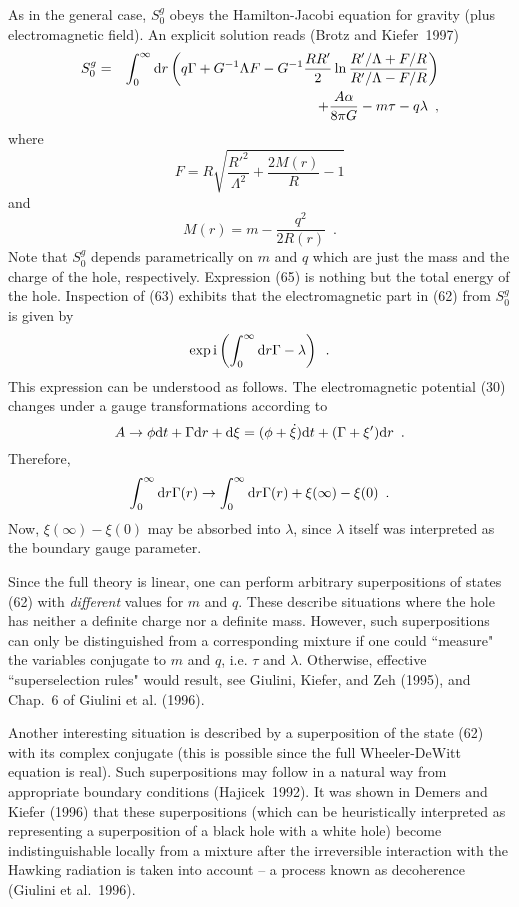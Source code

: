 \documentclass[12pt]{article}
\def\D{{\rm d}}
\def\I{{\rm i}}
\newcommand{\be}{\begin{equation}}
\newcommand{\ee}{\end{equation}}
\newcommand{\bea}{\begin{eqnarray}}
\newcommand{\eea}{\end{eqnarray}}
\begin{document}
As in the general case, $S_0^g$ obeys the Hamilton-Jacobi equation
for gravity (plus electromagnetic field). An explicit solution
reads (Brotz and Kiefer~1997)
\bea S_0^g &=& \int_0^{\infty}\D r\left(q\Gamma +G^{-1}\Lambda F
     -G^{-1}\frac{RR'}{2}\ln\frac{R'/\Lambda +F/R}
       {R'/\Lambda -F/R}\right) \nonumber\\
    & & \; +\frac{A\alpha}{8\pi G} -m\tau -q\lambda \enspace , \eea
where
\be F=R\sqrt{\frac{R'^2}{\Lambda^2}+ \frac{2M(r)}{R} -1} \ee
and
\be M(r)=m-\frac{q^2}{2R(r)} \enspace . \ee
Note that $S_0^g$ depends parametrically on $m$ and $q$
which are just the mass and the charge of the hole, respectively.
Expression (65) is nothing but the total energy of the hole.
Inspection of (63) exhibits that the electromagnetic part in
(62) from $S_0^g$ is given by
\[ \exp\I\left(\int_0^{\infty}\D r\Gamma -\lambda\right) \enspace . \]
This expression can be understood as follows. The electromagnetic
potential (30) changes under a gauge transformations according to
\be A \to \phi \D t +\Gamma\D r +\D \xi
     =(\phi+\dot{\xi})\D t+(\Gamma+\xi')\D r \enspace . \ee
Therefore,
\[ \int_0^{\infty}\D r\Gamma(r) \to \int_0^{\infty}
    \D r\Gamma(r)+\xi(\infty)-\xi(0) \enspace . \]
Now, $\xi(\infty)-\xi(0)$ may be absorbed into $\lambda$, since
$\lambda$ itself was interpreted as the boundary gauge parameter.

Since the full theory is linear, one can perform arbitrary
superpositions of states (62) with {\em different} values
for $m$ and $q$. These describe situations where the hole has neither
a definite charge nor a definite mass. However, such superpositions
can only be distinguished from a corresponding mixture if one
could ``measure" the variables conjugate to $m$ and $q$,
i.e. $\tau$ and $\lambda$. Otherwise, effective ``superselection
rules" would result, see Giulini, Kiefer, and Zeh (1995),
and Chap.~6 of Giulini et al. (1996).

Another interesting situation is described by a superposition
of the state (62) with its complex conjugate (this is possible
since the full Wheeler-DeWitt equation is real). Such
superpositions may follow in a natural way from appropriate
boundary conditions (Hajicek~1992). It was shown in
Demers and Kiefer (1996) that these superpositions (which can be
heuristically interpreted as representing a superposition
of a black hole with a white hole) become indistinguishable
locally from a mixture after the irreversible interaction
with the Hawking radiation is taken into account -- a process
known as decoherence (Giulini et al.~1996).
\end{document}
